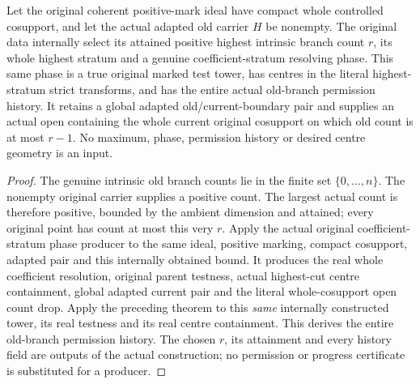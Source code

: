 \begin{theorem}
\label{hir:nc-original-highest-phase-all-joint-permissions}
\leanok
Let the original coherent positive-mark ideal have compact whole
controlled cosupport, and let the actual adapted old carrier $H$ be
nonempty. The original data internally select its attained positive
highest intrinsic branch count $r$, its whole highest stratum and a
genuine coefficient-stratum resolving phase. This same phase is a true
original marked test tower, has centres in the literal highest-stratum
strict transforms, and has the entire actual old-branch permission
history. It retains a global adapted old/current-boundary pair and
supplies an actual open containing the whole current original
cosupport on which old count is at most $r-1$. No maximum, phase,
permission history or desired centre geometry is an input.
\end{theorem}
\begin{proof}
The genuine intrinsic old branch counts lie in the finite set
$\{0,\ldots,n\}$. The nonempty original carrier supplies a positive
count. The largest actual count is therefore positive, bounded by the
ambient dimension and attained; every original point has count at
most this very $r$. Apply the actual original coefficient-stratum phase
producer to the same ideal, positive marking, compact cosupport,
adapted pair and this internally obtained bound. It produces the real
whole coefficient resolution, original parent testness, actual
highest-cut centre containment, global adapted current pair and the
literal whole-cosupport open count drop. Apply the preceding theorem
to this \emph{same} internally constructed tower, its real testness and
its real centre containment. This derives the entire old-branch
permission history. The chosen $r$, its attainment and every history
field are outputs of the actual construction; no permission or
progress certificate is substituted for a producer.
\end{proof}
